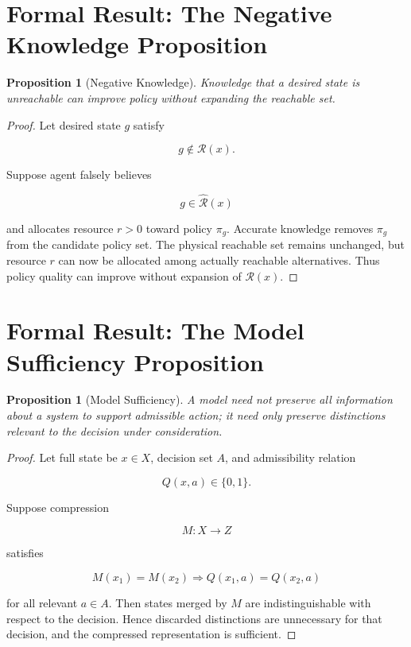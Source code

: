 \documentclass[11pt,oneside]{book}
\newtheorem{proposition}[theorem]{Proposition}
\theoremstyle{definition}
\theoremstyle{remark}
\newcommand{\R}{\mathcal{R}}
\begin{document}
\section{Formal Result: The Negative Knowledge Proposition}

\begin{proposition}[Negative Knowledge]
Knowledge that a desired state is unreachable can improve policy without expanding the reachable set.
\end{proposition}

\begin{proof}
Let desired state \(g\) satisfy

\[
g\notin\R(x).
\]

Suppose agent falsely believes

\[
g\in\widehat{\R}(x)
\]

and allocates resource \(r>0\) toward policy \(\pi_g\). Accurate knowledge removes \(\pi_g\) from the candidate policy set. The physical reachable set remains unchanged, but resource \(r\) can now be allocated among actually reachable alternatives. Thus policy quality can improve without expansion of \(\R(x)\).
\end{proof}

\section{Formal Result: The Model Sufficiency Proposition}

\begin{proposition}[Model Sufficiency]
A model need not preserve all information about a system to support admissible action; it need only preserve distinctions relevant to the decision under consideration.
\end{proposition}

\begin{proof}
Let full state be \(x\in X\), decision set \(A\), and admissibility relation

\[
Q(x,a)\in\{0,1\}.
\]

Suppose compression

\[
M:X\rightarrow Z
\]

satisfies

\[
M(x_1)=M(x_2)
\Rightarrow
Q(x_1,a)=Q(x_2,a)
\]

for all relevant \(a\in A\). Then states merged by \(M\) are indistinguishable with respect to the decision. Hence discarded distinctions are unnecessary for that decision, and the compressed representation is sufficient.
\end{proof}
\end{document}
